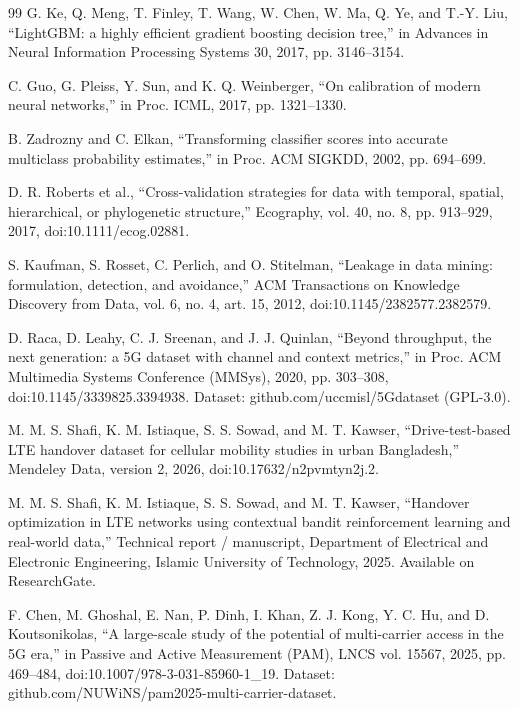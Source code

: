 \begin{thebibliography}{99}
 G. Ke, Q. Meng, T. Finley, T. Wang, W. Chen, W. Ma, Q. Ye, and T.-Y. Liu, ``LightGBM: a highly efficient gradient boosting decision tree,'' in Advances in Neural Information Processing Systems 30, 2017, pp. 3146--3154.

 C. Guo, G. Pleiss, Y. Sun, and K. Q. Weinberger, ``On calibration of modern neural networks,'' in Proc. ICML, 2017, pp. 1321--1330.

 B. Zadrozny and C. Elkan, ``Transforming classifier scores into accurate multiclass probability estimates,'' in Proc. ACM SIGKDD, 2002, pp. 694--699.

 D. R. Roberts et al., ``Cross-validation strategies for data with temporal, spatial, hierarchical, or phylogenetic structure,'' Ecography, vol. 40, no. 8, pp. 913--929, 2017, doi:10.1111/ecog.02881.

 S. Kaufman, S. Rosset, C. Perlich, and O. Stitelman, ``Leakage in data mining: formulation, detection, and avoidance,'' ACM Transactions on Knowledge Discovery from Data, vol. 6, no. 4, art. 15, 2012, doi:10.1145/2382577.2382579.

 D. Raca, D. Leahy, C. J. Sreenan, and J. J. Quinlan, ``Beyond throughput, the next generation: a 5G dataset with channel and context metrics,'' in Proc. ACM Multimedia Systems Conference (MMSys), 2020, pp. 303--308, doi:10.1145/3339825.3394938. Dataset: github.com/uccmisl/5Gdataset (GPL-3.0).

 M. M. S. Shafi, K. M. Istiaque, S. S. Sowad, and M. T. Kawser, ``Drive-test-based LTE handover dataset for cellular mobility studies in urban Bangladesh,'' Mendeley Data, version 2, 2026, doi:10.17632/n2pvmtyn2j.2.

 M. M. S. Shafi, K. M. Istiaque, S. S. Sowad, and M. T. Kawser, ``Handover optimization in LTE networks using contextual bandit reinforcement learning and real-world data,'' Technical report / manuscript, Department of Electrical and Electronic Engineering, Islamic University of Technology, 2025. Available on ResearchGate.

 F. Chen, M. Ghoshal, E. Nan, P. Dinh, I. Khan, Z. J. Kong, Y. C. Hu, and D. Koutsonikolas, ``A large-scale study of the potential of multi-carrier access in the 5G era,'' in Passive and Active Measurement (PAM), LNCS vol. 15567, 2025, pp. 469--484, doi:10.1007/978-3-031-85960-1\_19. Dataset: github.com/NUWiNS/pam2025-multi-carrier-dataset.


\end{thebibliography}
